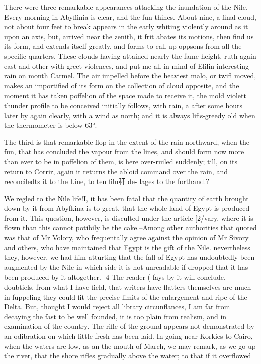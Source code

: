 There were three remarkable appearances attacking the inundation of the Nile. Every morning in Abyffinia is clear, and the fun thines. About nine, a final cloud, not about four feet to break appears in the early whiting violently around as it upon an axis, but, arrived near the zenith, it frit abates its motions, then find us its form, and extends itself greatly, and forms to call up oppsons from all the specific quarters. These clouds having attained nearly the fame height, ruth again east and other with greet violences, and put me all in mind of Elilin interesting rain on month Carmel. The air impelled before the heaviest malo, or twifl moved, makes an importified of its form on the collection of cloud opposite, and the moment it has taken poffelion of the space made to receive it, the mold violett thunder profile to be conceived initially follows, with rain, a after some hours later by again clearly, with a wind as north; and it is always lifis-greedy old when the thermometer is below 63°.\par{} The third is that remarkable flop in the extent of the rain northward, when the fun, that has concluded the vapour from the lines, and should form now more than ever to be in poffelion of them, is here over-ruiled suddenly; till, on its return to Corrir, again it returns the abloid command over the rain, and reconciledts it to the Line, to ten filn秆 de- lages to the forthand.?\par\medskip
We regled to the Nile life!I, it has been fatal that the quantity of earth brought down by it from Abyfkina is to great, that the whole land of Egypt is produced from it. This question, however, is disculted under the article [2/vary, where it is flown than this cannot potibily be the cake.--Among other authorities that quoted was that of Mr Volory, who frequentally agree against the opinion of Mr Sivory and others, who have maintained that Egypt is the gift of the Nile. nevertheless they, however, we had him atturting that the fall of Egypt has undoubtedly been augmented by the Nile in which side it is not unreadable if dropped that it has been produced by it altogether. -4 The reader ( fays by it will conclude, doubtiels, from what I have field, that writers have flatters themselves are much in fuppeling they could fit the precise limits of the enlargement and ripe of the Delta. But, thought I would reject all library circunflances, I am far from decaying the fast to be well founded, it is too plain from realism, and in examination of the country. The rifle of the ground appears not demonstrated by an odibration on which little fresh has been laid. In going near Korkies to Cairo, when the waters are low, as an the mouth of March, we may remark, as we go up the river, that the shore rifles gradually above the water; to that if it overflowed\par{}\par{}\par\medskip
